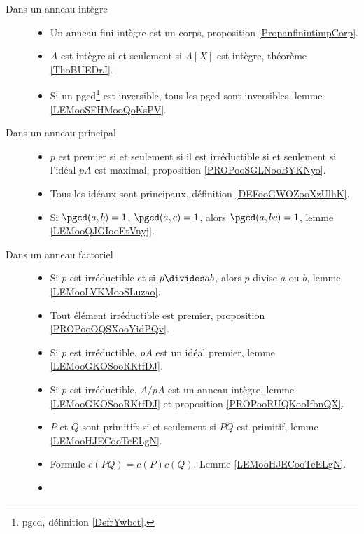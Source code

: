 \begin{description}
	\item[Dans un anneau intègre]\hspace{1cm}
	\begin{itemize}
		\item
		      Un anneau fini intègre est un corps, proposition \ref{PropanfinintimpCorp}.
		\item
		      \( A\) est intègre si et seulement si \( A[X]\) est intègre, théorème \ref{ThoBUEDrJ}.
		\item
		      Si un pgcd\footnote{pgcd, définition \ref{DefrYwbct}.} est inversible, tous les pgcd sont inversibles, lemme \ref{LEMooSFHMooQoKsPV}.
	\end{itemize}
	\item[Dans un anneau principal]\hspace{1cm}
	\begin{itemize}
		\item
		      \( p\) est premier si et seulement si il est irréductible si et seulement si l'idéal \( pA\) est maximal, proposition \ref{PROPooSGLNooBYKNyo}.
		\item
		      Tous les idéaux sont principaux, définition \ref{DEFooGWOZooXzUlhK}.
		\item
		      Si \( \pgcd(a,b)=1\), \( \pgcd(a,c)=1\), alors \( \pgcd(a,bc)=1\), lemme \ref{LEMooQJGIooEtVnyj}.
	\end{itemize}
	\item[Dans un anneau factoriel]\hspace{1cm}
	\begin{itemize}
		\item
		      Si \( p\) est irréductible et si \( p\divides ab\), alors \( p\) divise \( a\) ou \( b\), lemme \ref{LEMooLVKMooSLuzao}.
		\item
		      Tout élément irréductible est premier, proposition \ref{PROPooOQSXooYidPQv}.
		\item
		      Si \( p\) est irréductible, \( pA\) est un idéal premier, lemme \ref{LEMooGKOSooRKtfDJ}.
		\item
		      Si \( p\) est irréductible, \( A/pA\) est un anneau intègre, lemme \ref{LEMooGKOSooRKtfDJ} et proposition \ref{PROPooRUQKooIfbnQX}.
		\item
		      \( P\) et \( Q\) sont primitifs si et seulement si \( PQ\) est primitif, lemme \ref{LEMooHJECooTeELgN}.
		\item
		      Formule \( c(PQ)=c(P)c(Q)\). Lemme \ref{LEMooHJECooTeELgN}.
		\item

\end{itemize}
\end{description}
